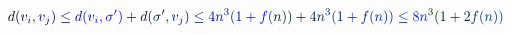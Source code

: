 \documentclass[12pt]{article}
\begin{document}
\makeatletter
\renewcommand*{\@textcolor}[3]{%
  \protect\leavevmode
  \begingroup
    \color#1{#2}#3%
  \endgroup
}
\makeatother
\begin{displaymath}
\mathcolor[RGB]{0,0,15}{d} \mathcolor[RGB]{0,0,30}{(} \mathcolor[RGB]{0,0,45}{v} _ { \mathcolor[RGB]{0,0,60}{i} } \mathcolor[RGB]{0,0,75}{,} \mathcolor[RGB]{0,0,90}{v} _ { \mathcolor[RGB]{0,0,105}{j} } \mathcolor[RGB]{0,0,120}{)} \mathcolor[RGB]{0,0,135}{\leq} \mathcolor[RGB]{0,0,150}{d} \mathcolor[RGB]{0,0,165}{(} \mathcolor[RGB]{0,0,180}{v} _ { \mathcolor[RGB]{0,0,195}{i} } \mathcolor[RGB]{0,0,210}{,} \mathcolor[RGB]{0,0,225}{\sigma} ^ { \mathcolor[RGB]{0,0,240}{\prime} } \mathcolor[RGB]{0,0,255}{)} \mathcolor[RGB]{0,15,0}{+} \mathcolor[RGB]{0,15,15}{d} \mathcolor[RGB]{0,15,30}{(} \mathcolor[RGB]{0,15,45}{\sigma} ^ { \mathcolor[RGB]{0,15,60}{\prime} } \mathcolor[RGB]{0,15,75}{,} \mathcolor[RGB]{0,15,90}{v} _ { \mathcolor[RGB]{0,15,105}{j} } \mathcolor[RGB]{0,15,120}{)} \mathcolor[RGB]{0,15,135}{\leq} \mathcolor[RGB]{0,15,150}{4} \mathcolor[RGB]{0,15,165}{n} ^ { \mathcolor[RGB]{0,15,180}{3} } \mathcolor[RGB]{0,15,195}{(} \mathcolor[RGB]{0,15,210}{1} \mathcolor[RGB]{0,15,225}{+} \mathcolor[RGB]{0,15,240}{f} \mathcolor[RGB]{0,15,255}{(} \mathcolor[RGB]{0,30,0}{n} \mathcolor[RGB]{0,30,15}{)} \mathcolor[RGB]{0,30,30}{)} \mathcolor[RGB]{0,30,45}{+} \mathcolor[RGB]{0,30,60}{4} \mathcolor[RGB]{0,30,75}{n} ^ { \mathcolor[RGB]{0,30,90}{3} } \mathcolor[RGB]{0,30,105}{(} \mathcolor[RGB]{0,30,120}{1} \mathcolor[RGB]{0,30,135}{+} \mathcolor[RGB]{0,30,150}{f} \mathcolor[RGB]{0,30,165}{(} \mathcolor[RGB]{0,30,180}{n} \mathcolor[RGB]{0,30,195}{)} \mathcolor[RGB]{0,30,210}{)} \mathcolor[RGB]{0,30,225}{\leq} \mathcolor[RGB]{0,30,240}{8} \mathcolor[RGB]{0,30,255}{n} ^ { \mathcolor[RGB]{0,45,0}{3} } \mathcolor[RGB]{0,45,15}{(} \mathcolor[RGB]{0,45,30}{1} \mathcolor[RGB]{0,45,45}{+} \mathcolor[RGB]{0,45,60}{2} \mathcolor[RGB]{0,45,75}{f} \mathcolor[RGB]{0,45,90}{(} \mathcolor[RGB]{0,45,105}{n} \mathcolor[RGB]{0,45,120}{)} \mathcolor[RGB]{0,45,135}{)}
\end{displaymath}
\end{document}
